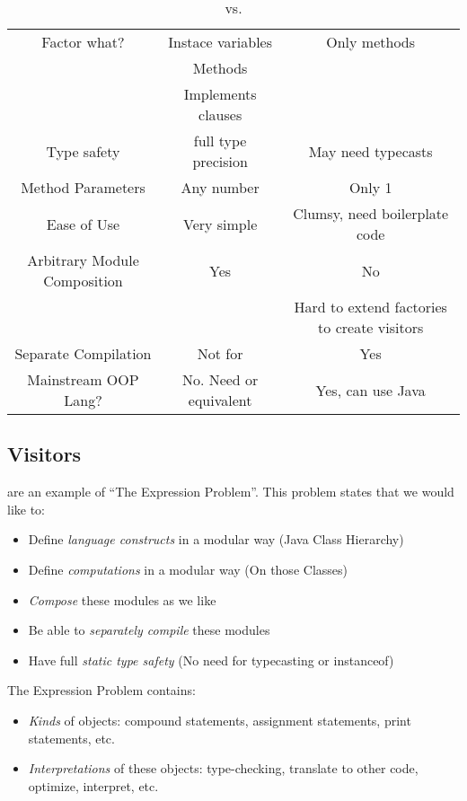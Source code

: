 \begin{table}[h!]
  \centering
  \begin{tabular}{ccc}
    \toprule
    & \nameref{def:Aspect_Oriented_Programming} & \nameref{def:Visitors} \\
    \midrule
    Factor what? & Instace variables & Only methods \\
    & Methods & \\
    & Implements clauses & \\
    \midrule
    Type safety & full type precision & May need typecasts \\
    \midrule
    Method Parameters & Any number & Only 1 \\
    \midrule
    Ease of Use & Very simple & Clumsy, need boilerplate code \\
    \midrule
    Arbitrary Module Composition & Yes & No \\
    & & Hard to extend factories to create visitors \\
    \midrule
    Separate Compilation & Not for \JastAdd{} & Yes \\
    \midrule
    Mainstream OOP Lang? & No. Need \JastAdd{} or equivalent & Yes, can use Java \\
    \bottomrule
  \end{tabular}
  \caption{ vs. }
  \label{tab:Visitors_vs_AOP}
\end{table}

\subsection{Visitors}\label{subsec:Visitors}
 are an example of ``The Expression Problem''.
This problem states that we would like to:
\begin{itemize}[noitemsep]
\item Define \emph{language constructs} in a modular way (Java Class Hierarchy)
\item Define \emph{computations} in a modular way (On those Classes)
\item \emph{Compose} these modules as we like
\item Be able to \emph{separately compile} these modules
\item Have full \emph{static type safety} (No need for typecasting or instanceof)
\end{itemize}

The Expression Problem contains:
\begin{itemize}[noitemsep]
\item \textit{Kinds} of objects: compound statements, assignment statements, print statements, etc.
\item \textit{Interpretations} of these objects: type-checking, translate to other code, optimize, interpret, etc.
\end{itemize}

